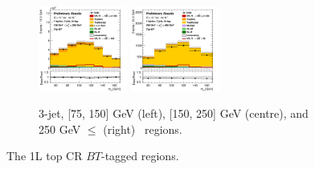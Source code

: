 \begin{figure}[h!]
\begin{subfigure}[b]{\textwidth}
        \includegraphics[width=0.32\textwidth]{Images/VH/Own_fit/prefit_VHcc/Region_distmBB_BMax250_BMin150_DtopCRBC_J3_TTypebt_T1_L1_Y6051_Prefit.png}
        \includegraphics[width=0.32\textwidth]{Images/VH/Own_fit/prefit_VHcc/Region_distmBB_BMax400_BMin250_DtopCRBC_J3_TTypebt_T1_L1_Y6051_Prefit.png}
        \caption{3-jet, [75, 150] GeV (left), [150, 250] GeV (centre), and 250 GeV $\leq$ (right) \ptv\ regions.}
        \label{fig:plots_VHcc_1L_TopCR_3J}
    \end{subfigure}
    \caption{The 1L top CR $BT$-tagged regions.}
    \label{fig:plots_VHcc_1L_TopCR}
\end{figure}
